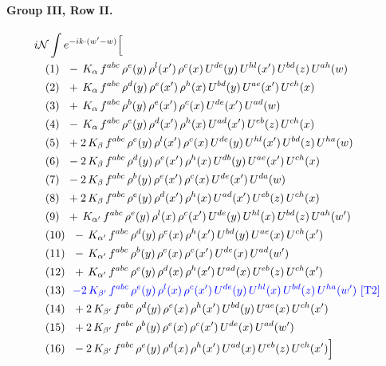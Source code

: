 \documentclass[10pt]{article}
\numberwithin{equation}{section}
\newcommand{\NN}{\mathcal N}
\begin{document}
\paragraph{Group III, Row II.}
\begin{align*}
&i\NN\int e^{-ik\cdot(w'-w)}\Big[\\
&\quad\text{(1)}\ \ -\,K_{\alpha}\,f^{abc}\,\rho^{e}(y)\,\rho^{l}(x')\,\rho^{c}(x)\,U^{de}(y)\,U^{hl}(x')\,U^{bd}(z)\,U^{ah}(w)\\
&\quad\text{(2)}\ \ +\,K_{\alpha}\,f^{abc}\,\rho^{d}(y)\,\rho^{e}(x')\,\rho^{h}(x)\,U^{bd}(y)\,U^{ae}(x')\,U^{ch}(x)\\
&\quad\text{(3)}\ \ +\,K_{\alpha}\,f^{abc}\,\rho^{b}(y)\,\rho^{e}(x')\,\rho^{c}(x)\,U^{de}(x')\,U^{ad}(w)\\
&\quad\text{(4)}\ \ -\,K_{\alpha}\,f^{abc}\,\rho^{e}(y)\,\rho^{d}(x')\,\rho^{h}(x)\,U^{ad}(x')\,U^{eb}(z)\,U^{ch}(x)\\
&\quad\text{(5)}\ \ +2\,K_{\beta}\,f^{abc}\,\rho^{e}(y)\,\rho^{l}(x')\,\rho^{c}(x)\,U^{de}(y)\,U^{hl}(x')\,U^{bd}(z)\,U^{ha}(w)\\
&\quad\text{(6)}\ \ -2\,K_{\beta}\,f^{abc}\,\rho^{d}(y)\,\rho^{e}(x')\,\rho^{h}(x)\,U^{db}(y)\,U^{ae}(x')\,U^{ch}(x)\\
&\quad\text{(7)}\ \ -2\,K_{\beta}\,f^{abc}\,\rho^{b}(y)\,\rho^{e}(x')\,\rho^{c}(x)\,U^{de}(x')\,U^{da}(w)\\
&\quad\text{(8)}\ \ +2\,K_{\beta}\,f^{abc}\,\rho^{e}(y)\,\rho^{d}(x')\,\rho^{h}(x)\,U^{ad}(x')\,U^{eb}(z)\,U^{ch}(x)\\
&\quad\text{(9)}\ \ +\,K_{\alpha'}\,f^{abc}\,\rho^{e}(y)\,\rho^{l}(x)\,\rho^{c}(x')\,U^{de}(y)\,U^{hl}(x)\,U^{bd}(z)\,U^{ah}(w')\\
&\quad\text{(10)}\ \ -\,K_{\alpha'}\,f^{abc}\,\rho^{d}(y)\,\rho^{e}(x)\,\rho^{h}(x')\,U^{bd}(y)\,U^{ae}(x)\,U^{ch}(x')\\
&\quad\text{(11)}\ \ -\,K_{\alpha'}\,f^{abc}\,\rho^{b}(y)\,\rho^{e}(x)\,\rho^{c}(x')\,U^{de}(x)\,U^{ad}(w')\\
&\quad\text{(12)}\ \ +\,K_{\alpha'}\,f^{abc}\,\rho^{e}(y)\,\rho^{d}(x)\,\rho^{h}(x')\,U^{ad}(x)\,U^{eb}(z)\,U^{ch}(x')\\
&\quad\text{(13)}\ \ \textcolor{blue}{-2\,K_{\beta'}\,f^{abc}\,\rho^{e}(y)\,\rho^{l}(x)\,\rho^{c}(x')\,U^{de}(y)\,U^{hl}(x)\,U^{bd}(z)\,U^{ha}(w')}\ \text{\textcolor{blue}{[T2]}}\\
&\quad\text{(14)}\ \ +2\,K_{\beta'}\,f^{abc}\,\rho^{d}(y)\,\rho^{e}(x)\,\rho^{h}(x')\,U^{bd}(y)\,U^{ae}(x)\,U^{ch}(x')\\
&\quad\text{(15)}\ \ +2\,K_{\beta'}\,f^{abc}\,\rho^{b}(y)\,\rho^{e}(x)\,\rho^{c}(x')\,U^{de}(x)\,U^{ad}(w')\\
&\quad\text{(16)}\ \ -2\,K_{\beta'}\,f^{abc}\,\rho^{e}(y)\,\rho^{d}(x)\,\rho^{h}(x')\,U^{ad}(x)\,U^{eb}(z)\,U^{ch}(x')\Big]
\end{align*}
\end{document}
